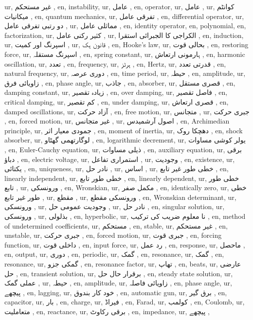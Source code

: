 ur, غیر مستحکم ,
en, instability,
ur, عامل ,
en, operator,
ur, عامل ,
ur, کوانٹم میکانیات ,
en, quantum mechanics,
ur, تفرقی عامل ,
en, differential operator,
ur, دو رتبی تفرقی عامل ,
ur, مماثلی عامل ,
en, identity operator,
en, polynomial,
en, factorization,
ur, کثیر رکنی عامل ,
ur, الکراجی کا الجبرائی استقرا ,
en, induction,
ur, اسپرنگ اور کمیت ,
ur, قانون ہک ,
en, Hooke's law,
ur, بحالی قوت ,
en, restoring force,
ur, اسپرنگ مستقلہ ,
en, spring constant,
ur, ہارمونی ارتعاش ,
en, harmonic oscillation,
ur, تعدد ,
en, frequency,
ur, ہرٹز ,
en, Hertz,
ur, قدرتی تعدد ,
en, natural frequency,
ur, دوری عرصہ ,
en, time period,
ur, حیطہ ,
en, amplitude,
ur, زاویائی فرق ,
en, phase angle,
ur, جاذب ,
en, absorber,
ur, قصری مستقل ,
en, damping constant,
ur, زیادہ تقصیر ,
en, over damping,
ur, فاصل تقصیر ,
en, critical damping,
ur, کم تقصیر ,
en, under damping,
ur, قصری ارتعاش ,
en, damped oscillations,
ur, آزاد حرکت ,
en, free motion,
ur, متجانس ,
ur, جبری حرکت ,
en, forced motion,
ur, غیر متجانس ,
ur, اصول آرشمیدس ,
en, Archimedian principle,
ur, جمودی معیار اثر ,
en, moment of inertia,
ur, دھچکا روک ,
en, shock absorber,
ur, لوگارتھمی گھٹاو ,
en, logarithmic decrement,
ur, یولر کوشی مساوات ,
en, Euler-Cauchy equation,
ur, ذیلی مساوات ,
en, auxiliary equation,
ur, برقی دباؤ ,
en, electric voltage,
ur, استمراری تفاعل ,
ur, وجودیت ,
en, existence,
ur, یکتائی ,
en, uniqueness,
ur, نادر حل ,
ur, اساس ,
ur, خطی طور غیر تابع ,
en, linearly independent,
ur, خطی طور تابع ,
en, linearly dependent,
ur, خطی طور تابع ,
ur, ورونسکی ,
en, Wronskian,
ur, مکمل صفر ,
en, identically zero,
ur, خطی طور غیر تابع ,
ur, مقطع ,
ur, ورونسکی مقطع ,
en, Wronskian determinant,
ur, ورونسکی ,
ur, وجودیت عمومی حل ,
ur, نادر حل ,
en, singular solution,
ur, ورونسکی ,
ur, بذلولی ,
en, hyperbolic,
ur, نا معلوم ضریب کی ترکیب ,
en, method of undetermined coefficients,
ur, مستحکم ,
en, stable,
ur, غیر مستحکم ,
en, unstable,
ur, جبری حرکت ,
en, forced motion,
ur, جبری قوت ,
en, forcing function,
ur, داخلی قوت ,
en, input force,
ur, رد عمل ,
en, response,
ur, ماحصل ,
en, output,
ur, دوری ,
en, periodic,
ur, گمک ,
en, resonance,
ur, گمک ,
en, resonance,
ur, گمکی جزو ,
en, resonance factor,
ur, تھاپ ,
en, beats,
ur, عارضی حل ,
en, transient solution,
ur, برقرار حال حل ,
en, steady state solution,
ur, عملی گمک ,
ur, حیطہ ,
en, amplitude,
ur, زاویائی فاصلہ ,
en, phase angle,
ur, پیچھے ,
en, lagging,
ur, خود کار بندوق ,
en, automatic gun,
ur, برق گیر ,
en, capacitor,
ur, بار ,
en, charge,
ur, فیراڈ ,
en, Farad,
ur, کولمب ,
en, Coulomb,
ur, متعاملیت ,
en, reactance,
ur, برقی رکاوٹ ,
en, impedance,
ur, پیچھے ,
